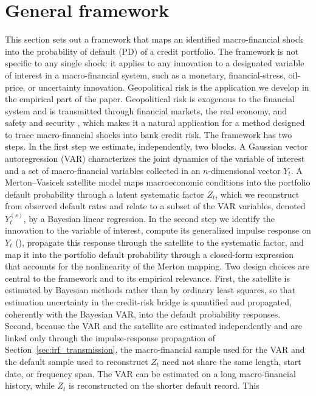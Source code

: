 \section{General framework}
\label{sec:framework}
This section sets out a framework that maps an identified macro-financial shock
into the probability of default (PD) of a credit portfolio. The framework is not
specific to any single shock: it applies to any innovation to a designated
variable of interest in a macro-financial system, such as a monetary,
financial-stress, oil-price, or uncertainty innovation. Geopolitical risk is the
application we develop in the empirical part of the paper. Geopolitical risk is
exogenous to the financial system and is transmitted through financial markets,
the real economy, and safety and security \citep{buch2024global}, which makes it
a natural application for a method designed to trace macro-financial shocks into
bank credit risk.
\medskip
The framework has two steps. In the first step we estimate, independently, two
blocks. A Gaussian vector autoregression (VAR) characterizes the joint dynamics
of the variable of interest and a set of macro-financial variables collected in
an $n$-dimensional vector $Y_t$. A Merton--Vasicek satellite model maps
macroeconomic conditions into the portfolio default probability through a latent
systematic factor $Z_t$, which we reconstruct from observed default rates and
relate to a subset of the VAR variables, denoted $Y_t^{(s)}$, by a Bayesian
linear regression. In the second step we identify the innovation to the variable
of interest, compute its generalized impulse response on $Y_t$
(\citealp{koop1996impulse}), propagate this response through the satellite to the
systematic factor, and map it into the portfolio default probability through a
closed-form expression that accounts for the nonlinearity of the Merton mapping.
\medskip
Two design choices are central to the framework and to its empirical relevance.
First, the satellite is estimated by Bayesian methods rather than by ordinary
least squares, so that estimation uncertainty in the credit-risk bridge is
quantified and propagated, coherently with the Bayesian VAR, into the default
probability responses. Second, because the VAR and the satellite are estimated
independently and are linked only through the impulse-response propagation of
Section~\ref{sec:irf_transmission}, the macro-financial sample used for the VAR
and the default sample used to reconstruct $Z_t$ need not share the same length,
start date, or frequency span. The VAR can be estimated on a long macro-financial
history, while $Z_t$ is reconstructed on the shorter default record. This
